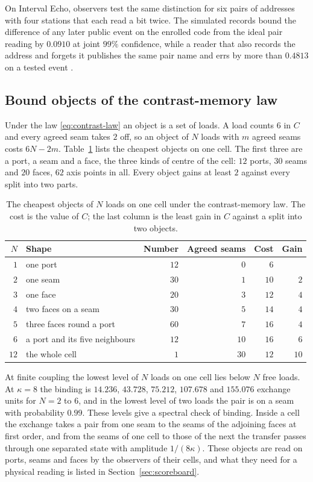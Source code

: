 \documentclass[11pt]{article}
\theoremstyle{definition}
\theoremstyle{remark}
\begin{document}
On Interval Echo, observers test the same distinction for six pairs of
addresses with four stations that each read a bit twice. The simulated
records bound the difference of any later public event on the enrolled
code from the ideal pair reading by $0.0910$ at joint $99\%$ confidence,
while a reader that also records the address and forgets it publishes the
same pair name and errs by more than $0.4813$ on a tested event
\cite{ophspine}.

\subsection{Bound objects of the contrast-memory law}
\label{sec:bound-objects}

Under the law \eqref{eq:contrast-law} an object is a set of loads. A load
counts $6$ in $C$ and every agreed seam takes $2$ off, so an object of $N$
loads with $m$ agreed seams costs $6N-2m$.
Table~\ref{tab:bound-objects} lists the cheapest objects on one cell. The
first three are a port, a seam and a face, the three kinds of centre of
the cell: $12$ ports, $30$ seams and $20$ faces, $62$ axis points in all.
Every object gains at least $2$ against every split into two parts.

\begin{table}[htbp]
\centering\small
\caption{The cheapest objects of $N$ loads on one cell under the
contrast-memory law. The cost is the value of $C$; the last column is the
least gain in $C$ against a split into two objects.}
\label{tab:bound-objects}
\begin{tabular}{@{}rlrrrr@{}}
\toprule
$N$ & \textbf{Shape} & \textbf{Number} & \textbf{Agreed seams} & \textbf{Cost} & \textbf{Gain}\\
\midrule
$1$ & one port & $12$ & $0$ & $6$ & \\
$2$ & one seam & $30$ & $1$ & $10$ & $2$\\
$3$ & one face & $20$ & $3$ & $12$ & $4$\\
$4$ & two faces on a seam & $30$ & $5$ & $14$ & $4$\\
$5$ & three faces round a port & $60$ & $7$ & $16$ & $4$\\
$6$ & a port and its five neighbours & $12$ & $10$ & $16$ & $6$\\
$12$ & the whole cell & $1$ & $30$ & $12$ & $10$\\
\bottomrule
\end{tabular}
\end{table}

At finite coupling the lowest level of $N$ loads on one cell lies below
$N$ free loads. At $\kappa=8$ the binding is $14.236$, $43.728$,
$75.212$, $107.678$ and $155.076$ exchange units for $N=2$ to $6$, and in
the lowest level of two loads the pair is on a seam with probability
$0.99$. These levels give a spectral check of binding. Inside a cell the exchange
takes a pair from one seam to the seams of the adjoining faces at first
order, and from the seams of one cell to those of the next the transfer
passes through one separated state with amplitude $1/(8\kappa)$. These
objects are read on ports, seams and faces by the observers of their
cells, and what they need for a physical reading is listed in
Section~\ref{sec:scoreboard}.
\end{document}
